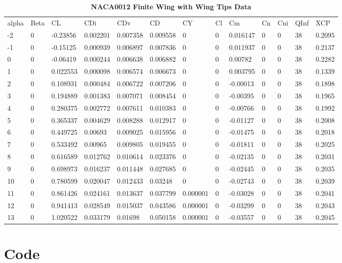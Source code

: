 \begin{singlespace}
\begin{table}[H]
\caption{\textbf{NACA0012 Finite Wing with Wing Tips Data}} \label{table:NACA0012_finite_tips}
\begin{tabular}{|l|l|l|l|l|l|l|l|l|l|l|l|l|}
alpha & Beta & CL       & CDi      & CDv      & CD       & CY       & Cl & Cm       & Cn & Cni & QInf & XCP    \\
-2    & 0    & -0.23856 & 0.002201 & 0.007358 & 0.009558 & 0        & 0  & 0.016147 & 0  & 0   & 38   & 0.2095 \\
-1    & 0    & -0.15125 & 0.000939 & 0.006897 & 0.007836 & 0        & 0  & 0.011937 & 0  & 0   & 38   & 0.2137 \\
0     & 0    & -0.06419 & 0.000244 & 0.006638 & 0.006882 & 0        & 0  & 0.00782  & 0  & 0   & 38   & 0.2282 \\
1     & 0    & 0.022553 & 0.000098 & 0.006574 & 0.006673 & 0        & 0  & 0.003795 & 0  & 0   & 38   & 0.1339 \\
2     & 0    & 0.108931 & 0.000484 & 0.006722 & 0.007206 & 0        & 0  & -0.00013 & 0  & 0   & 38   & 0.1898 \\
3     & 0    & 0.194889 & 0.001383 & 0.007071 & 0.008454 & 0        & 0  & -0.00395 & 0  & 0   & 38   & 0.1965 \\
4     & 0    & 0.280375 & 0.002772 & 0.007611 & 0.010383 & 0        & 0  & -0.00766 & 0  & 0   & 38   & 0.1992 \\
5     & 0    & 0.365337 & 0.004629 & 0.008288 & 0.012917 & 0        & 0  & -0.01127 & 0  & 0   & 38   & 0.2008 \\
6     & 0    & 0.449725 & 0.00693  & 0.009025 & 0.015956 & 0        & 0  & -0.01475 & 0  & 0   & 38   & 0.2018 \\
7     & 0    & 0.533492 & 0.00965  & 0.009805 & 0.019455 & 0        & 0  & -0.01811 & 0  & 0   & 38   & 0.2025 \\
8     & 0    & 0.616589 & 0.012762 & 0.010614 & 0.023376 & 0        & 0  & -0.02135 & 0  & 0   & 38   & 0.2031 \\
9     & 0    & 0.698973 & 0.016237 & 0.011448 & 0.027685 & 0        & 0  & -0.02445 & 0  & 0   & 38   & 0.2035 \\
10    & 0    & 0.780599 & 0.020047 & 0.012433 & 0.03248  & 0        & 0  & -0.02743 & 0  & 0   & 38   & 0.2039 \\
11    & 0    & 0.861426 & 0.024161 & 0.013637 & 0.037799 & 0.000001 & 0  & -0.03028 & 0  & 0   & 38   & 0.2041 \\
12    & 0    & 0.941413 & 0.028549 & 0.015037 & 0.043586 & 0.000001 & 0  & -0.03299 & 0  & 0   & 38   & 0.2043 \\
13    & 0    & 1.020522 & 0.033179 & 0.01698  & 0.050158 & 0.000001 & 0  & -0.03557 & 0  & 0   & 38   & 0.2045        
\end{tabular}
\end{table}
\newpage
\section{\textbf{Code}}
    
\end{singlespace}
